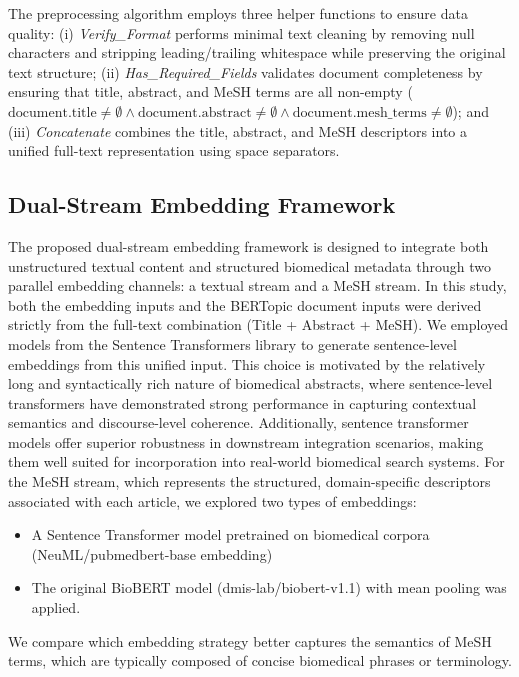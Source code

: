 \documentclass[authorproof,JACIII,researchpaper]{fujipressarticle}
\begin{document}
The preprocessing algorithm employs three helper functions to ensure data quality: (i) \textit{Verify\_Format} performs minimal text cleaning by removing null characters and stripping leading/trailing whitespace while preserving the original text structure; (ii) \textit{Has\_Required\_Fields} validates document completeness by ensuring that title, abstract, and MeSH terms are all non-empty ($\text{document.title} \neq \emptyset \land \text{document.abstract} \neq \emptyset \land \text{document.mesh\_terms} \neq \emptyset$); and (iii) \textit{Concatenate} combines the title, abstract, and MeSH descriptors into a unified full-text representation using space separators.

\subsection{Dual-Stream Embedding Framework}
The proposed dual-stream embedding framework is designed to integrate both unstructured textual content and structured biomedical metadata through two parallel embedding channels: a textual stream and a MeSH stream.
In this study, both the embedding inputs and the BERTopic document inputs were derived strictly from the full-text combination (Title + Abstract + MeSH). We employed models from the Sentence Transformers library to generate sentence-level embeddings from this unified input. This choice is motivated by the relatively long and syntactically rich nature of biomedical abstracts, where sentence-level transformers have demonstrated strong performance in capturing contextual semantics and discourse-level coherence\cite{reimers_sentence-bert_2019}. Additionally, sentence transformer models offer superior robustness in downstream integration scenarios, making them well suited for incorporation into real-world biomedical search systems.
For the MeSH stream, which represents the structured, domain-specific descriptors associated with each article, we explored two types of embeddings:
\begin{itemize}
    \item A Sentence Transformer model pretrained on biomedical corpora (NeuML/pubmedbert-base embedding)
    \item The original BioBERT model (dmis-lab/biobert-v1.1) with mean pooling was applied.
\end{itemize}
We compare which embedding strategy better captures the semantics of MeSH terms, which are typically composed of concise biomedical phrases or terminology.
\end{document}
